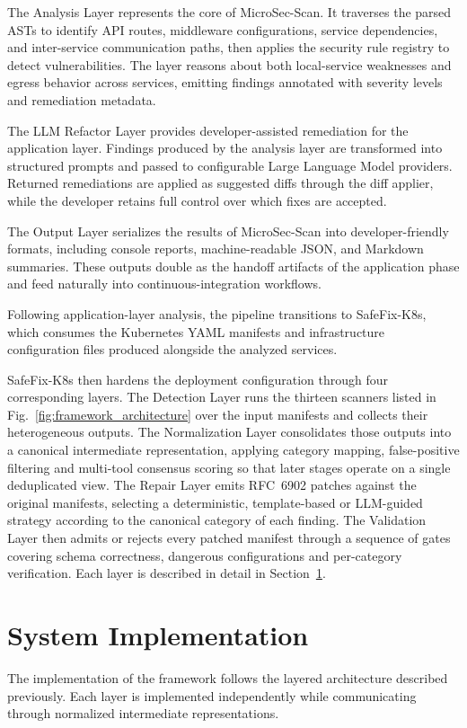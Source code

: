 \documentclass[preprint,12pt]{elsarticle}
\newcommand{\new}[1]{#1}
\begin{document}
\new{The Analysis Layer represents the core of MicroSec-Scan. It traverses the
parsed ASTs to identify API routes, middleware configurations, service
dependencies, and inter-service communication paths, then applies the
security rule registry to detect vulnerabilities. The layer reasons about
both local-service weaknesses and egress behavior across services, emitting
findings annotated with severity levels and remediation metadata.}

\new{The LLM Refactor Layer provides developer-assisted remediation for the
application layer. Findings produced by the analysis layer are transformed
into structured prompts and passed to configurable Large Language Model
providers. Returned remediations are applied as suggested diffs through the
diff applier, while the developer retains full control over which fixes are
accepted.}

\new{The Output Layer serializes the results of MicroSec-Scan into
developer-friendly formats, including console reports, machine-readable JSON,
and Markdown summaries. These outputs double as the handoff artifacts of the
application phase and feed naturally into continuous-integration workflows.}

\new{Following application-layer analysis, the pipeline transitions to
SafeFix-K8s, which consumes the Kubernetes YAML manifests and infrastructure
configuration files produced alongside the analyzed services.}


\new{SafeFix-K8s then hardens the deployment configuration through four
corresponding layers. The Detection Layer runs the thirteen scanners listed in
Fig.~\ref{fig:framework_architecture} over the input manifests and collects
their heterogeneous outputs. The Normalization Layer consolidates those
outputs into a canonical intermediate representation, applying category
mapping, false-positive filtering and multi-tool consensus scoring so that
later stages operate on a single deduplicated view. The Repair Layer emits
RFC~6902 patches against the original manifests, selecting a deterministic,
template-based or LLM-guided strategy according to the canonical category of
each finding. The Validation Layer then admits or rejects every patched
manifest through a sequence of gates covering schema correctness, dangerous
configurations and per-category verification. Each layer is described in
detail in Section~\ref{sec:implementation}.}

\section{System Implementation}
\label{sec:implementation}
The implementation of the framework follows the layered architecture
described previously. Each layer is implemented independently while
communicating through normalized intermediate representations.
\end{document}
